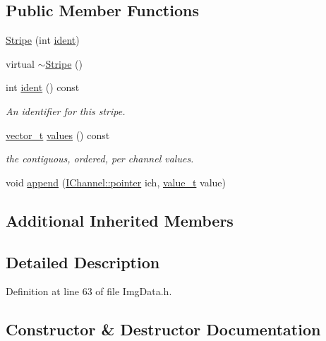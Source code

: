 \subsection*{Public Member Functions}
\begin{DoxyCompactItemize}
\item 
\hyperlink{class_wire_cell_1_1_img_1_1_data_1_1_stripe_a5377b05e26e4abf3aeff408af544f1c1}{Stripe} (int \hyperlink{class_wire_cell_1_1_img_1_1_data_1_1_stripe_a9795b25ab93a45b59670f8105dbb78ae}{ident})
\item 
virtual \hyperlink{class_wire_cell_1_1_img_1_1_data_1_1_stripe_ae6eb51e2a280c409bafefc550ce2a8ee}{$\sim$\+Stripe} ()
\item 
int \hyperlink{class_wire_cell_1_1_img_1_1_data_1_1_stripe_a9795b25ab93a45b59670f8105dbb78ae}{ident} () const
\begin{DoxyCompactList}\small\item\em An identifier for this stripe. \end{DoxyCompactList}\item 
\hyperlink{class_wire_cell_1_1_i_stripe_af5a7b9f663e9ecbc71edfb44c989101e}{vector\+\_\+t} \hyperlink{class_wire_cell_1_1_img_1_1_data_1_1_stripe_a72dce0e16019dff990761fc29fca0e30}{values} () const
\begin{DoxyCompactList}\small\item\em the contiguous, ordered, per channel values. \end{DoxyCompactList}\item 
void \hyperlink{class_wire_cell_1_1_img_1_1_data_1_1_stripe_a6db6bec2ca29d9ed1ebfa53ff046aa3c}{append} (\hyperlink{class_wire_cell_1_1_i_data_aff870b3ae8333cf9265941eef62498bc}{I\+Channel\+::pointer} ich, \hyperlink{class_wire_cell_1_1_i_stripe_af0dd73bc2517c2c848c24ea56caefde6}{value\+\_\+t} value)
\end{DoxyCompactItemize}
\subsection*{Additional Inherited Members}


\subsection{Detailed Description}


Definition at line 63 of file Img\+Data.\+h.



\subsection{Constructor \& Destructor Documentation}
\mbox{\label{class_wire_cell_1_1_img_1_1_data_1_1_stripe_a5377b05e26e4abf3aeff408af544f1c1}} 
